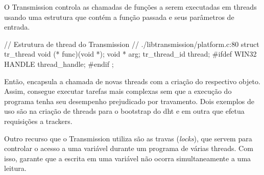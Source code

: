 O Transmission controla as chamadas de funções a serem executadas em \glspl*{thread}
usando uma estrutura que contém a função passada e seus parâmetros de entrada.

\begin{ccode}
// Estrutura de thread do Transmission
// ./libtransmission/platform.c:80
struct tr_thread {
    void            (* func)(void *);
    void             * arg;
    tr_thread_id       thread;
#ifdef WIN32
    HANDLE             thread_handle;
#endif
};
\end{ccode}

Então, encapsula a chamada de novas \glspl*{thread} com a criação do respectivo objeto.
Assim, consegue executar tarefas mais complexas sem que a execução do programa tenha seu
desempenho prejudicado por travamento. Dois exemplos de uso são na criação de
\glspl*{thread} para o \gls{bootstrap} do \gls{dht} e em outra que efetua requisições a
\glspl{tracker}.


Outro recurso que o Transmission utiliza são as travas (\emph{locks}), que servem para
controlar o acesso a uma variável durante um programa de várias \glspl*{thread}. Com
isso, garante que a escrita em uma variável não ocorra simultaneamente a uma leitura.

